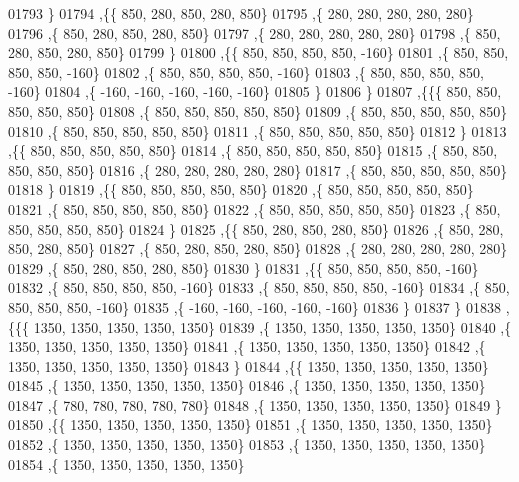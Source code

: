 \begin{DoxyCode}
01793    \}
01794   ,\{\{   850,   280,   850,   280,   850\}
01795    ,\{   280,   280,   280,   280,   280\}
01796    ,\{   850,   280,   850,   280,   850\}
01797    ,\{   280,   280,   280,   280,   280\}
01798    ,\{   850,   280,   850,   280,   850\}
01799    \}
01800   ,\{\{   850,   850,   850,   850,  -160\}
01801    ,\{   850,   850,   850,   850,  -160\}
01802    ,\{   850,   850,   850,   850,  -160\}
01803    ,\{   850,   850,   850,   850,  -160\}
01804    ,\{  -160,  -160,  -160,  -160,  -160\}
01805    \}
01806   \}
01807  ,\{\{\{   850,   850,   850,   850,   850\}
01808    ,\{   850,   850,   850,   850,   850\}
01809    ,\{   850,   850,   850,   850,   850\}
01810    ,\{   850,   850,   850,   850,   850\}
01811    ,\{   850,   850,   850,   850,   850\}
01812    \}
01813   ,\{\{   850,   850,   850,   850,   850\}
01814    ,\{   850,   850,   850,   850,   850\}
01815    ,\{   850,   850,   850,   850,   850\}
01816    ,\{   280,   280,   280,   280,   280\}
01817    ,\{   850,   850,   850,   850,   850\}
01818    \}
01819   ,\{\{   850,   850,   850,   850,   850\}
01820    ,\{   850,   850,   850,   850,   850\}
01821    ,\{   850,   850,   850,   850,   850\}
01822    ,\{   850,   850,   850,   850,   850\}
01823    ,\{   850,   850,   850,   850,   850\}
01824    \}
01825   ,\{\{   850,   280,   850,   280,   850\}
01826    ,\{   850,   280,   850,   280,   850\}
01827    ,\{   850,   280,   850,   280,   850\}
01828    ,\{   280,   280,   280,   280,   280\}
01829    ,\{   850,   280,   850,   280,   850\}
01830    \}
01831   ,\{\{   850,   850,   850,   850,  -160\}
01832    ,\{   850,   850,   850,   850,  -160\}
01833    ,\{   850,   850,   850,   850,  -160\}
01834    ,\{   850,   850,   850,   850,  -160\}
01835    ,\{  -160,  -160,  -160,  -160,  -160\}
01836    \}
01837   \}
01838  ,\{\{\{  1350,  1350,  1350,  1350,  1350\}
01839    ,\{  1350,  1350,  1350,  1350,  1350\}
01840    ,\{  1350,  1350,  1350,  1350,  1350\}
01841    ,\{  1350,  1350,  1350,  1350,  1350\}
01842    ,\{  1350,  1350,  1350,  1350,  1350\}
01843    \}
01844   ,\{\{  1350,  1350,  1350,  1350,  1350\}
01845    ,\{  1350,  1350,  1350,  1350,  1350\}
01846    ,\{  1350,  1350,  1350,  1350,  1350\}
01847    ,\{   780,   780,   780,   780,   780\}
01848    ,\{  1350,  1350,  1350,  1350,  1350\}
01849    \}
01850   ,\{\{  1350,  1350,  1350,  1350,  1350\}
01851    ,\{  1350,  1350,  1350,  1350,  1350\}
01852    ,\{  1350,  1350,  1350,  1350,  1350\}
01853    ,\{  1350,  1350,  1350,  1350,  1350\}
01854    ,\{  1350,  1350,  1350,  1350,  1350\}

\end{DoxyCode}
